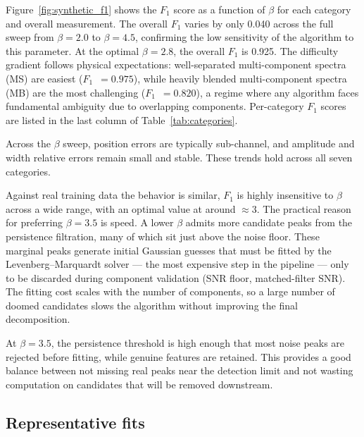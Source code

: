 \documentclass[twocolumn,twocolappendix,aj]{aastex631}
\begin{document}
Figure~\ref{fig:synthetic_f1} shows the $F_1$ score as a function of $\beta$ for
each category and overall measurement.  The overall $F_1$ varies by only 0.040 across the
full sweep from $\beta = 2.0$ to $\beta = 4.5$, confirming the low
sensitivity of the algorithm to this parameter.  At the optimal
$\beta = 2.8$, the overall $F_1$ is 0.925.  The difficulty gradient follows
physical expectations: well-separated multi-component spectra (MS) are
easiest ($F_1$~$= 0.975$), while heavily blended multi-component spectra (MB) are
the most challenging ($F_1$~$= 0.820$), a regime where any algorithm faces
fundamental ambiguity due to overlapping components.  Per-category $F_1$
scores are listed in the last column of Table~\ref{tab:categories}.


Across the $\beta$ sweep, position errors are typically sub-channel, and
amplitude and width relative errors remain small and stable.  These trends
hold across all seven categories.

Against real training data the behavior is similar, $F_1$ is highly insensitive
to $\beta$ across a wide range, with an optimal value at around $\approx 3$.
The practical reason for preferring $\beta=3.5$ is speed. A lower $\beta$ admits
more candidate peaks from the persistence filtration, many of which sit just
above the noise floor. These marginal peaks generate initial Gaussian guesses
that must be fitted by the Levenberg--Marquardt solver --- the most expensive
step in the pipeline --- only to be discarded during component validation
(SNR floor, matched-filter SNR). The fitting cost scales with the number of
components, so a large number of doomed candidates slows the algorithm without
improving the final decomposition.

At $\beta = 3.5$, the persistence threshold is high enough that most noise
peaks are rejected before fitting, while genuine features are retained.
This provides a good balance between not missing real peaks near the detection
limit and not wasting computation on candidates that will be removed downstream.

\subsection{Representative fits}\label{sec:representative}
\end{document}
